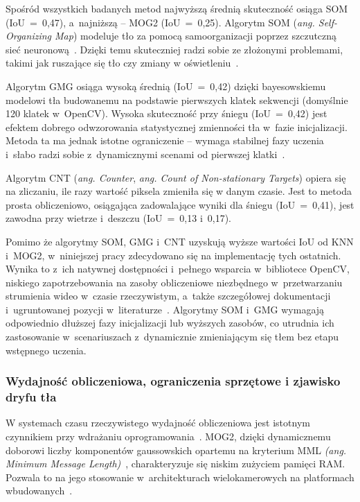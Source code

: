 Spośród wszystkich badanych metod najwyższą średnią skuteczność osiąga SOM (IoU~=~0,47),
a~najniższą -- MOG2 (IoU~=~0,25). Algorytm SOM (\textit{ang. Self-Organizing Map}) modeluje tło za
pomocą samoorganizacji poprzez szczutczną sieć neuronową~\cite{karbowiak2022}. Dzięki temu
skuteczniej radzi sobie ze złożonymi problemami, takimi jak ruszające się tło czy zmiany w
oświetleniu~\cite{karbowiak2022}.

Algorytm GMG osiąga wysoką średnią (IoU~=~0,42) dzięki bayesowskiemu modelowi tła budowanemu na
podstawie pierwszych klatek sekwencji (domyślnie 120 klatek w~OpenCV). Wysoka skuteczność przy
śniegu (IoU~=~0,42) jest efektem dobrego odwzorowania statystycznej zmienności tła w~fazie
inicjalizacji. Metoda ta ma jednak istotne ograniczenie -- wymaga stabilnej fazy uczenia i~słabo
radzi sobie z~dynamicznymi scenami od pierwszej klatki~\cite{karbowiak2022}.

Algorytm CNT (\textit{ang. Counter}, \textit{ang. Count of Non-stationary Targets}) opiera się na
zliczaniu, ile razy wartość piksela zmieniła się w danym czasie. Jest to metoda prosta
obliczeniowo, osiągająca zadowalające wyniki dla śniegu (IoU~=~0,41), jest zawodna przy wietrze
i~deszczu (IoU~=~0,13 i~0,17).

Pomimo że algorytmy SOM, GMG i~CNT uzyskują wyższe wartości IoU od KNN i~MOG2, w~niniejszej pracy
zdecydowano się na implementację tych ostatnich. Wynika to z~ich natywnej dostępności i~pełnego
wsparcia w~bibliotece OpenCV, niskiego zapotrzebowania na zasoby obliczeniowe niezbędnego
w~przetwarzaniu strumienia wideo w~czasie rzeczywistym, a~także szczegółowej dokumentacji
i~ugruntowanej pozycji w~literaturze~\cite{zivkovic2006}. Algorytmy SOM i~GMG wymagają odpowiednio
dłuższej fazy inicjalizacji lub wyższych zasobów, co utrudnia ich zastosowanie w~scenariuszach
z~dynamicznie zmieniającym się tłem bez etapu wstępnego uczenia.

\subsubsection{Wydajność obliczeniowa, ograniczenia sprzętowe i zjawisko dryfu tła}

W systemach czasu rzeczywistego wydajność obliczeniowa jest istotnym czynnikiem przy wdrażaniu
oprogramowania~\cite{bouwmans2014}. MOG2, dzięki dynamicznemu doborowi liczby komponentów
gaussowskich opartemu na kryterium MML \textit{(ang. Minimum Message Length)}~\cite{zivkovic2004},
charakteryzuje się niskim zużyciem pamięci RAM. Pozwala to na jego stosowanie w~architekturach
wielokamerowych na platformach wbudowanych~\cite{waghmare2026}.

